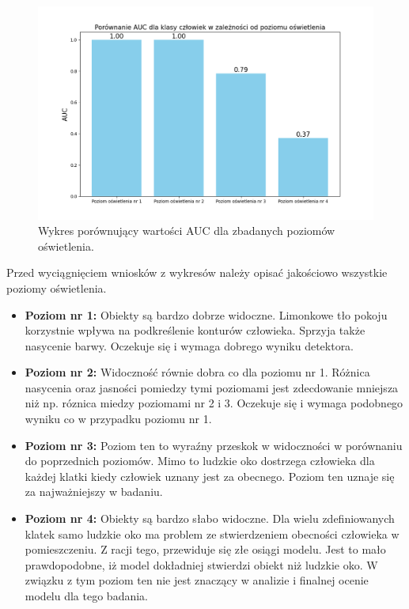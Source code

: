 \begin{figure}[H]
    \centering
    \includegraphics[width=\linewidth]{r_test_dokładności/AUC_charts/porownanieAUC.png}
    \caption{Wykres porównujący wartości AUC dla zbadanych poziomów oświetlenia.}
    \label{fig:AUC}
\end{figure}

Przed wyciągnięciem wniosków z wykresów należy opisać jakościowo wszystkie poziomy oświetlenia. 
\begin{itemize}
    \item \textbf{Poziom nr 1:} Obiekty są bardzo dobrze widoczne. Limonkowe tło pokoju korzystnie wpływa na podkreślenie konturów człowieka. Sprzyja także nasycenie barwy. Oczekuje się i wymaga dobrego wyniku detektora. 
    \item \textbf{Poziom nr 2:} Widoczność równie dobra co dla poziomu nr 1. Różnica nasycenia oraz jasności pomiedzy tymi poziomami jest zdecdowanie mniejsza niż np. róznica miedzy poziomami nr 2 i 3. Oczekuje się i wymaga podobnego wyniku co w przypadku poziomu nr 1.
    \item \textbf{Poziom nr 3:} Poziom ten to wyraźny przeskok w widoczności w porównaniu do poprzednich poziomów. Mimo to ludzkie oko dostrzega człowieka dla każdej klatki kiedy człowiek uznany jest za obecnego. Poziom ten uznaje się za najważniejszy w badaniu.
    \item \textbf{Poziom nr 4:} Obiekty są bardzo słabo widoczne. Dla wielu zdefiniowanych klatek samo ludzkie oko ma problem ze stwierdzeniem obecności człowieka w pomieszczeniu. Z racji tego, przewiduje się złe osiągi modelu. Jest to mało prawdopodobne, iż model dokładniej stwierdzi obiekt niż ludzkie oko. W związku z tym poziom ten nie jest znaczący w analizie i finalnej ocenie modelu dla tego badania. 
\end{itemize}

